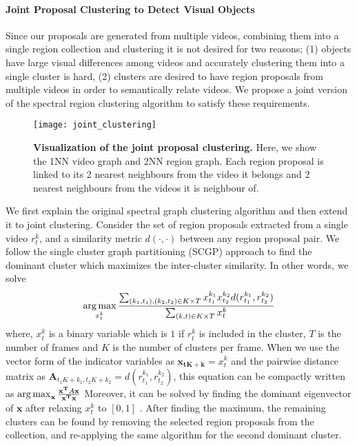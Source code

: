 \paragraph{Joint Proposal Clustering to Detect Visual Objects}
Since our proposals are generated from multiple videos, combining them into a single region collection and clustering it is not desired for two reasons; (1) objects have large visual differences among videos and accurately clustering them into a single cluster is hard, (2) clusters are desired to have region proposals from multiple videos in order to semantically relate videos. We propose a joint version of the spectral region clustering algorithm to satisfy these requirements.

\begin{figure}[ht]
  \texttt{[image: joint\_clustering]}
  \caption{\textbf{Visualization of the joint proposal clustering.} Here, we show the 1NN video graph and 2NN region graph. Each region proposal is linked to its 2 nearest neighbours from the video it belongs and 2 nearest neighbours from the videos it is neighbour of.}
  \label{hierProposal}
\end{figure}

We first explain the original spectral graph clustering algorithm and then extend it to joint clustering. Consider the set of region proposals extracted from a single video $r^k_t$, and a similarity metric $d(\cdot,\cdot)$ between any region proposal pair. We follow the single cluster graph partitioning (SCGP)\cite{scgp} approach to find the dominant cluster which maximizes the inter-cluster similarity. In other words, we solve
\begin{equation}
  \operatorname*{arg\,max}_{x^k_t} \frac{\sum_{(k_1,t_1),(k_2,t_2) \in K \times T} x^{k_1}_{t_1} x^{k_2}_{t_2} d(r^{k_1}_{t_1},r^{k_2}_{t_2})}{\sum_{(k,t) \in K \times T} x^{k}_t}
\end{equation}
where, $x^{k}_t$ is a binary variable which is $1$ if $r^{k}_t$ is included in the cluster, $T$ is the number of frames and $K$ is the number of clusters per frame. When we use the vector form of the indicator variables as $\mathbf{x_{tK+k}}=x^{k}_{t}$ and the pairwise distance matrix as $\mathbf{A}_{t_1K+k_1,t_2K+k_2}=d(r^{k_1}_{t_1},r^{k_2}_{t_2})$, this equation can be compactly written as
$\operatorname*{arg\,max}_{\mathbf{x}} \frac{\mathbf{x^T}A\mathbf{x}}{\mathbf{x^T}\mathbf{x}}$
Moreover, it can be solved by finding the dominant eigenvector of $\mathbf{x}$ after relaxing $x^{k}_t$ to $[0,1]$ \cite{scgp,scgp_eigen}. After finding the maximum, the remaining clusters can be found by removing the selected region proposals from the collection, and re-applying the same algorithm for the second dominant cluster.

